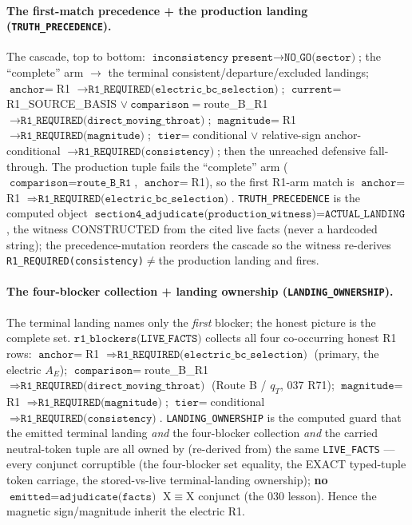 \paragraph{The first-match precedence + the production landing (\texttt{TRUTH\_PRECEDENCE}).}
The cascade, top to bottom: \(\texttt{inconsistency present}\to\texttt{NO\_GO(sector)}\);
the ``complete'' arm \(\to\) the terminal consistent/departure/excluded
landings; \(\texttt{anchor}=\)R1 \(\to\texttt{R1\_REQUIRED(electric\_bc\_selection)}\);
\(\texttt{current}=\)R1\_SOURCE\_BASIS \(\vee\ \texttt{comparison}=\)route\_B\_R1
\(\to\texttt{R1\_REQUIRED(direct\_moving\_throat)}\);
\(\texttt{magnitude}=\)R1 \(\to\texttt{R1\_REQUIRED(magnitude)}\);
\(\texttt{tier}=\)conditional \(\vee\) relative-sign anchor-conditional
\(\to\texttt{R1\_REQUIRED(consistency)}\); then the unreached defensive
fall-through. The production tuple fails the ``complete'' arm
(\(\texttt{comparison}=\texttt{route\_B\_R1}\), \(\texttt{anchor}=\)R1), so the
first R1-arm match is \(\texttt{anchor}=\)R1
\(\Rightarrow\texttt{R1\_REQUIRED(electric\_bc\_selection)}\).
\texttt{TRUTH\_PRECEDENCE} is the computed object
\(\texttt{section4\_adjudicate(production\_witness)}=\texttt{ACTUAL\_LANDING}\),
the witness CONSTRUCTED from the cited live facts (never a hardcoded string);
the precedence-mutation reorders the cascade so the witness re-derives
\texttt{R1\_REQUIRED(consistency)}\(\neq\)the production landing and fires.

\paragraph{The four-blocker collection + landing ownership (\texttt{LANDING\_OWNERSHIP}).}
The terminal landing names only the \emph{first} blocker; the honest picture is
the complete set. \(\texttt{r1\_blockers(LIVE\_FACTS)}\) collects all four
co-occurring honest R1 rows: \(\texttt{anchor}=\)R1
\(\Rightarrow\texttt{R1\_REQUIRED(electric\_bc\_selection)}\) (primary, the
electric \(A_E\)); \(\texttt{comparison}=\)route\_B\_R1
\(\Rightarrow\texttt{R1\_REQUIRED(direct\_moving\_throat)}\) (Route B / \(q_T\),
037 R71); \(\texttt{magnitude}=\)R1
\(\Rightarrow\texttt{R1\_REQUIRED(magnitude)}\); \(\texttt{tier}=\)conditional
\(\Rightarrow\texttt{R1\_REQUIRED(consistency)}\). \texttt{LANDING\_OWNERSHIP} is
the computed guard that the emitted terminal landing \emph{and} the four-blocker
collection \emph{and} the carried neutral-token tuple are all owned by
(re-derived from) the same \texttt{LIVE\_FACTS} --- every conjunct corruptible
(the four-blocker set equality, the EXACT typed-tuple token carriage, the
stored-vs-live terminal-landing ownership); \textbf{no}
\(\texttt{emitted}=\texttt{adjudicate(facts)}\) X\(\equiv\)X conjunct (the 030
lesson). Hence the magnetic sign/magnitude inherit the electric R1.

